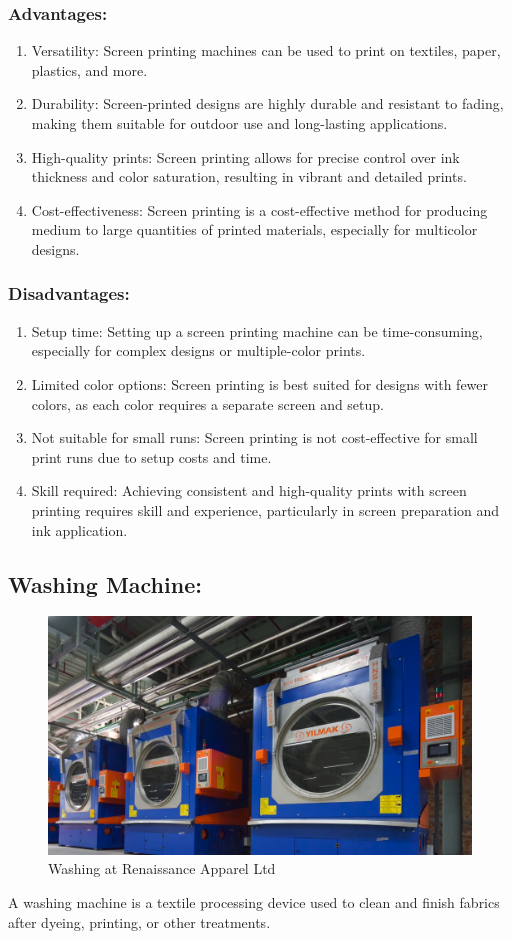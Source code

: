 \subsubsection{Advantages:}

\begin{enumerate}
\item
  Versatility: Screen printing machines can be used to print on
  textiles, paper, plastics, and more.
\item
  Durability: Screen-printed designs are highly durable and resistant to
  fading, making them suitable for outdoor use and long-lasting
  applications.
\item
  High-quality prints: Screen printing allows for precise control over
  ink thickness and color saturation, resulting in vibrant and detailed
  prints.
\item
  Cost-effectiveness: Screen printing is a cost-effective method for
  producing medium to large quantities of printed materials, especially
  for multicolor designs.
\end{enumerate}

\subsubsection{Disadvantages:}

\begin{enumerate}
\item
  Setup time: Setting up a screen printing machine can be
  time-consuming, especially for complex designs or multiple-color
  prints.
\item
  Limited color options: Screen printing is best suited for designs with
  fewer colors, as each color requires a separate screen and setup.
\item
  Not suitable for small runs: Screen printing is not cost-effective for
  small print runs due to setup costs and time.
\item
  Skill required: Achieving consistent and high-quality prints with
  screen printing requires skill and experience, particularly in screen
  preparation and ink application.
\end{enumerate}

\subsection{Washing Machine:}
\begin{figure}[h!]
  \centering
  \includegraphics[width=0.8\linewidth]{figs/washing.jpg}
  \caption{Washing at Renaissance Apparel Ltd}
  \label{fig:washing}
\end{figure}

A washing machine is a textile processing device used to clean and finish fabrics after dyeing, printing, or other treatments.
